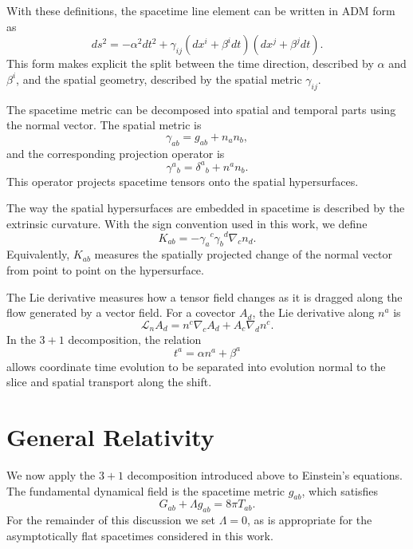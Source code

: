 With these definitions, the spacetime line element can be written in ADM form as
\begin{equation}
ds^2
=
-\alpha^2 dt^2
+
\gamma_{ij}
\left(dx^i+\beta^i dt\right)
\left(dx^j+\beta^j dt\right).
\end{equation}
This form makes explicit the split between the time direction, described by $\alpha$ and $\beta^i$, and the spatial geometry, described by the spatial metric $\gamma_{ij}$.

The spacetime metric can be decomposed into spatial and temporal parts using the normal vector. The spatial metric is
\begin{equation}
\gamma_{ab} = g_{ab} + n_a n_b ,
\end{equation}
and the corresponding projection operator is
\begin{equation}
\gamma^a{}_{b} = \delta^a{}_{b} + n^a n_b .
\end{equation}
This operator projects spacetime tensors onto the spatial hypersurfaces.

The way the spatial hypersurfaces are embedded in spacetime is described by the extrinsic curvature. With the sign convention used in this work, we define
\begin{equation}
K_{ab}
=
-\gamma_a{}^c\gamma_b{}^d\nabla_c n_d .
\end{equation}
Equivalently, $K_{ab}$ measures the spatially projected change of the normal vector from point to point on the hypersurface.

The Lie derivative measures how a tensor field changes as it is dragged along the flow generated by a vector field. For a covector $A_d$, the Lie derivative along $n^a$ is
\begin{equation}
\mathcal{L}_n A_d
=
n^c\nabla_c A_d
+
A_c\nabla_d n^c .
\end{equation}
In the $3+1$ decomposition, the relation
\begin{equation}
t^a = \alpha n^a + \beta^a
\end{equation}
allows coordinate time evolution to be separated into evolution normal to the slice and spatial transport along the shift.

\section{General Relativity}

We now apply the $3+1$ decomposition introduced above to Einstein's equations. The fundamental dynamical field is the spacetime metric $g_{ab}$, which satisfies
\begin{equation}
G_{ab} + \Lambda g_{ab} = 8\pi T_{ab}.
\label{eq:Einstein}
\end{equation}
For the remainder of this discussion we set $\Lambda=0$, as is appropriate for the asymptotically flat spacetimes considered in this work.

